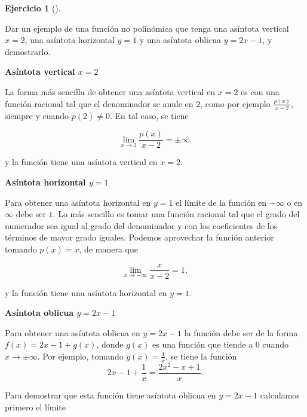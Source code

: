 \documentclass[
  spanish,
  a4paper,
]{scrreport}
\theoremstyle{definition}
\newtheorem{exercise}{Ejercicio}[chapter]
\theoremstyle{remark}
\begin{document}
\begin{exercise}[]\protect\hypertarget{exr-4}{}\label{exr-4}

Dar un ejemplo de una función no polinómica que tenga una asíntota
vertical \(x=2\), una asíntota horizontal \(y=1\) y una asíntota oblicua
\(y=2x-1\), y demostrarlo.

\end{exercise}

\begin{tcolorbox}[enhanced jigsaw, arc=.35mm, bottomrule=.15mm, bottomtitle=1mm, breakable, colback=white, colbacktitle=quarto-callout-tip-color!10!white, colframe=quarto-callout-tip-color-frame, coltitle=black, left=2mm, leftrule=.75mm, opacityback=0, opacitybacktitle=0.6, rightrule=.15mm, title=\textcolor{quarto-callout-tip-color}{\faLightbulb}\hspace{0.5em}{Solución}, titlerule=0mm, toprule=.15mm, toptitle=1mm]

\textbf{Asíntota vertical \(x=2\)}

La forma más sencilla de obtener una asíntota vertical en \(x=2\) es con
una función racional tal que el denominador se anule en \(2\), como por
ejemplo \(\frac{p(x)}{x-2}\), siempre y cuando \(p(2)\neq 0\). En tal
caso, se tiene

\[
\lim_{x\to 2} \frac{p(x)}{x-2} = \pm\infty.
\]

y la función tiene una asíntota vertical en \(x=2\).

\textbf{Asíntota horizontal \(y=1\)}

Para obtener una asíntota horizontal en \(y=1\) el límite de la función
en \(-\infty\) o en \(\infty\) debe ser \(1\). Lo más sencillo es tomar
una función racional tal que el grado del numerador sea igual al grado
del denominador y con los coeficientes de los términos de mayor grado
iguales. Podemos aprovechar la función anterior tomando \(p(x) = x\), de
manera que

\[
\lim_{x\to-\infty} \frac{x}{x-2} = 1,
\]

y la función tiene una asíntota horizontal en \(y=1\).

\textbf{Asíntota oblicua \(y=2x-1\)}

Para obtener una asíntota oblicua en \(y=2x-1\) la función debe ser de
la forma \(f(x) = 2x-1+g(x)\), donde \(g(x)\) es una función que tiende
a \(0\) cuando \(x\to\pm\infty\). Por ejemplo, tomando
\(g(x) = \frac{1}{x}\), se tiene la función \[
2x-1 + \frac{1}{x} = \frac{2x^2-x+1}{x}.
\]

Para demostrar que esta función tiene asíntota oblicua en \(y=2x-1\)
calculamos primero el límite


\end{tcolorbox}
\end{document}
